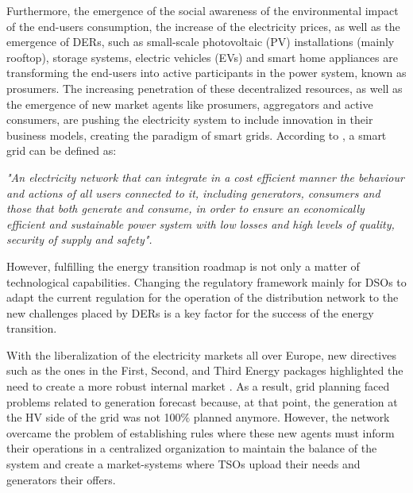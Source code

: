 Furthermore, the emergence of the social awareness of the environmental impact of the end-users consumption, the increase of the electricity prices, as well as the emergence of DERs, such as small-scale photovoltaic (PV) installations (mainly rooftop), storage systems, electric vehicles (EVs) and smart home appliances are transforming the end-users into active participants in the power system, known as prosumers. The increasing penetration of these decentralized resources, as well as the emergence of new market agents like prosumers, aggregators and active consumers, are pushing the electricity system to include innovation in their business models, creating the paradigm of smart grids. According to \cite{EuropeanParliamentSG}, a smart grid can be defined as:
\vspace*{3mm}
\begin{tcolorbox}
\textit{"An electricity network that can integrate in a cost efficient manner the behaviour and actions of all users connected to it, including generators, consumers and those that both generate and consume, in order to ensure an economically efficient and sustainable power system with low losses and high levels of quality, security of supply and safety".} 
\end{tcolorbox}
\vspace*{5mm}


However, fulfilling the energy transition roadmap is not only a matter of technological capabilities. Changing the regulatory framework mainly for DSOs to adapt the current regulation for the operation of the distribution network to the new challenges placed by DERs is a key factor for the success of the energy transition.

With the liberalization of the electricity markets all over Europe, new directives such as the ones in the First, Second, and Third Energy packages \cite{EuropeanCommission2003, EuropeanCommission2009} highlighted the need to create a more robust internal market \cite{Hancher2017, EUPHEMIA2016, antonopoulos2020nodal}. As a result, grid planning faced problems related to generation forecast because, at that point, the generation at the HV side of the grid was not 100$\%$ planned anymore. However, the network overcame the problem of establishing rules where these new agents must inform their operations in a centralized organization to maintain the balance of the system and create a market-systems where TSOs upload their needs and generators their offers. 

